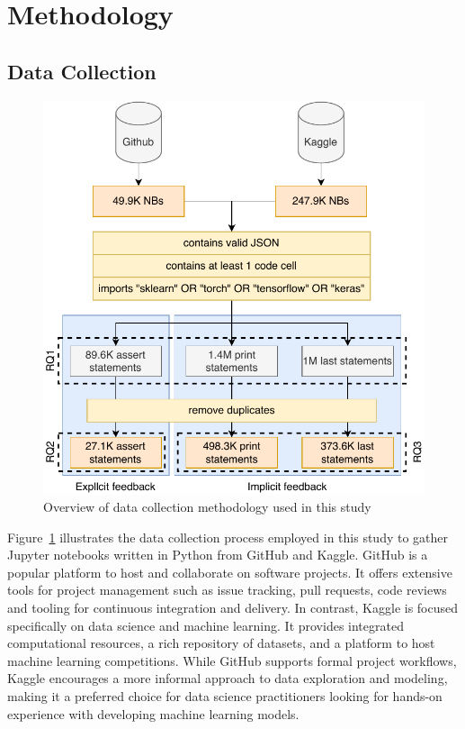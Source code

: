 \documentclass[smallextended]{svjour3}       %
\begin{document}
\section{Methodology}

\subsection{Data Collection}\label{sec:data-collect}

\begin{figure}
	\centering
	\includegraphics[width=0.75\linewidth]{data-collection.pdf}
	\caption{Overview of data collection methodology used in this study}
	\label{fig:data-collection}
\end{figure}

Figure~\ref{fig:data-collection} illustrates the data collection process employed in this study to gather Jupyter notebooks written in Python from GitHub and Kaggle. GitHub is a popular platform to host and collaborate on software projects. It offers extensive tools for project management such as issue tracking, pull requests, code reviews and tooling for continuous integration and delivery. In contrast, Kaggle is focused specifically on data science and machine learning. It provides integrated computational resources, a rich repository of datasets, and a platform to host machine learning competitions. While GitHub supports formal project workflows, Kaggle encourages a more informal approach to data exploration and modeling, making it a preferred choice for data science practitioners looking for hands-on experience with developing machine learning models.
\end{document}
